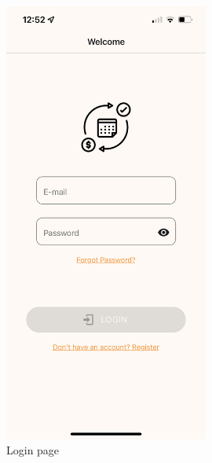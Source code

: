 \documentclass[12pt]{article}
\begin{document}
\begin{figure}[h!]
    \centering
    \begin{minipage}[c]{0.45\textwidth}
        \centering
        \includegraphics[width=0.6\textwidth, clip]{../../assets/smartphone/login.PNG}
        \caption{Login page}
        \label{fig:login}
    \end{minipage}\hspace{1cm}%
    \begin{minipage}[c]{0.45\textwidth}
        \centering

\end{minipage}
\end{figure}
\end{document}
